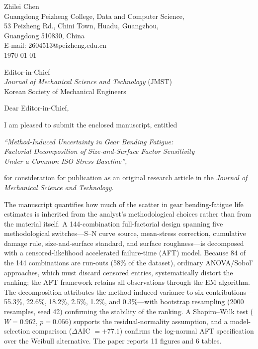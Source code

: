 \documentclass[12pt,a4paper]{article}
\begin{document}
\begin{flushright}
Zhilei Chen\\
Guangdong Peizheng College, Data and Computer Science,\\
53 Peizheng Rd., Chini Town, Huadu, Guangzhou,\\
Guangdong 510830, China\\
E-mail: 2604513@peizheng.edu.cn\\[4pt]
\today
\end{flushright}

\vspace{2mm}

\begin{flushleft}
Editor-in-Chief\\
\textit{Journal of Mechanical Science and Technology} (JMST)\\
Korean Society of Mechanical Engineers
\end{flushleft}

\vspace{4mm}

Dear Editor-in-Chief,

I am pleased to submit the enclosed manuscript, entitled

\begin{center}
\itshape ``Method-Induced Uncertainty in Gear Bending Fatigue:\\
Factorial Decomposition of Size-and-Surface Factor Sensitivity\\
Under a Common ISO Stress Baseline'',
\end{center}

for consideration for publication as an original research article in
the \textit{Journal of Mechanical Science and Technology}.

The manuscript quantifies how much of the scatter in gear
bending-fatigue life estimates is inherited from the analyst's
methodological choices rather than from the material itself. A
144-combination full-factorial design spanning five methodological
switches---S--N curve source, mean-stress correction, cumulative
damage rule, size-and-surface standard, and surface roughness---is
decomposed with a censored-likelihood accelerated failure-time (AFT)
model. Because 84 of the 144 combinations are run-outs (58\% of the
dataset), ordinary ANOVA/Sobol' approaches, which must discard
censored entries, systematically distort the ranking; the AFT
framework retains all observations through the EM algorithm. The
decomposition attributes the method-induced variance to six
contributions---55.3\%, 22.6\%, 18.2\%, 2.5\%, 1.2\%, and 0.3\%---with
bootstrap resampling (2000 resamples, seed 42) confirming the
stability of the ranking. A Shapiro--Wilk test ($W=0.962$, $p=0.056$)
supports the residual-normality assumption, and a model-selection
comparison ($\Delta$AIC $= +77.1$) confirms the log-normal AFT
specification over the Weibull alternative. The paper reports 11
figures and 6 tables.
\end{document}
